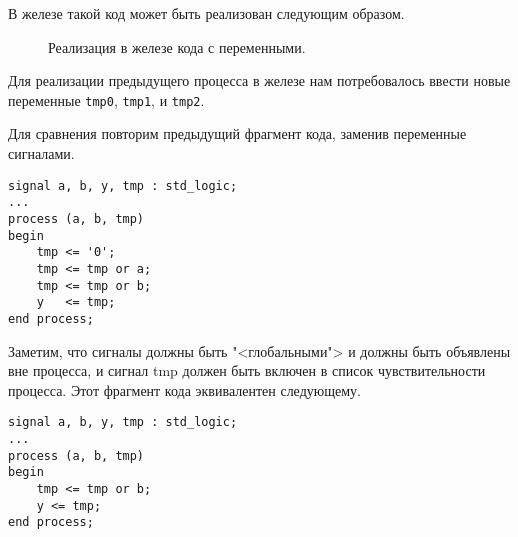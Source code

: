 В железе такой код может быть реализован следующим образом.

\begin{figure}[ht]
\centering
{}
\caption{Реализация в железе кода с переменными.}
\label{hardware_var_0}
\end{figure}

Для реализации предыдущего процесса в железе нам потребовалось ввести новые переменные \lstinline?tmp0?, \lstinline?tmp1?, и \lstinline?tmp2?.

Для сравнения повторим предыдущий фрагмент кода, заменив переменные сигналами.

\begin{Code}
\begin{lstlisting}
signal a, b, y, tmp : std_logic;
...
process (a, b, tmp)
begin
    tmp <= '0';
    tmp <= tmp or a;
    tmp <= tmp or b;
    y   <= tmp;
end process;
\end{lstlisting}
\end{Code}

Заметим, что сигналы должны быть "<глобальными"> и должны быть объявлены вне процесса, и сигнал tmp должен быть включен в список чувствительности процесса. Этот фрагмент кода эквивалентен следующему.

\begin{Code}
\begin{lstlisting}
signal a, b, y, tmp : std_logic;
...
process (a, b, tmp)
begin
    tmp <= tmp or b;
    y <= tmp;
end process;
\end{lstlisting}
\end{Code}


